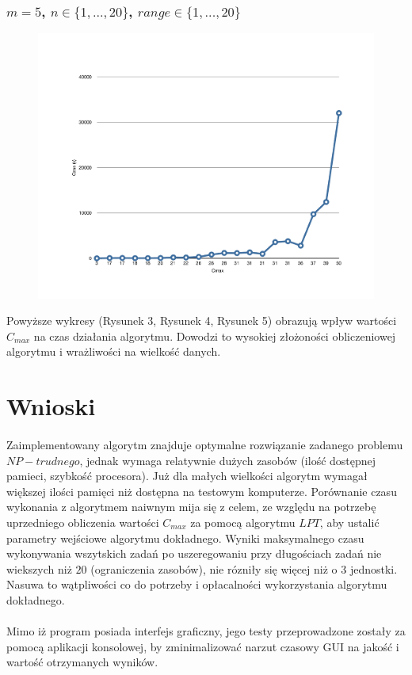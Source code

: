\documentclass[wide,a4paper,titlepage,12pt] {article}
\begin{document}
    \subsubsection{$m=5$, $n \in \{1,...,20\}$, $range \in \{1,...,20\}$}
     \begin{figure}[htbp]
      \begin{center}
       \includegraphics[width=\textwidth]{Fig5.pdf}
        \caption{}
	\label{fig5}
      \end{center}
    \end{figure}
    Powyższe wykresy (Rysunek 3, Rysunek 4, Rysunek 5) obrazują wpływ wartości $C_{max}$ na czas działania algorytmu. Dowodzi to wysokiej złożoności obliczeniowej algorytmu i wrażliwości na wielkość danych. 
\newpage
    \section{Wnioski}
\paragraph{}
     Zaimplementowany algorytm znajduje optymalne rozwiązanie zadanego problemu $NP-trudnego$, jednak wymaga relatywnie dużych zasobów (ilość dostępnej pamieci, szybkość procesora). Już dla małych wielkości algorytm wymagał większej ilości pamięci niż dostępna na testowym komputerze. Porównanie czasu wykonania z algorytmem naiwnym mija się z celem, ze względu na potrzebę uprzedniego obliczenia wartości $C_{max}$ za pomocą algorytmu $LPT$, aby ustalić parametry wejściowe algorytmu dokładnego. Wyniki maksymalnego czasu wykonywania wszytskich zadań po uszeregowaniu przy długościach zadań nie wiekszych niż $20$ (ograniczenia zasobów), nie rózniły się więcej niż o 3 jednostki. Nasuwa to wątpliwości co do potrzeby i opłacalności wykorzystania algorytmu dokładnego.    

\paragraph{}
Mimo iż program posiada interfejs graficzny, jego testy przeprowadzone zostały za pomocą aplikacji konsolowej, by zminimalizować narzut czasowy GUI na jakość i wartość otrzymanych wyników.
\end{document}

